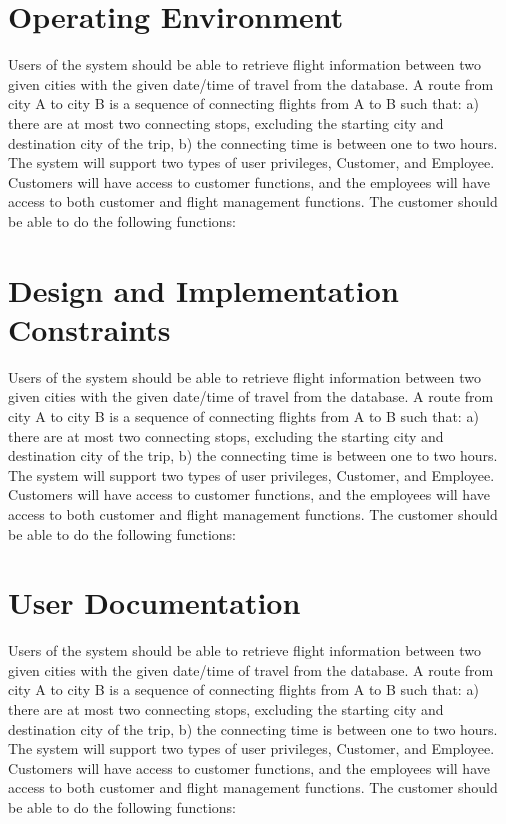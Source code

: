 \documentclass{scrreprt}
\begin{document}
    \section{Operating Environment}
    Users of the system should be able to retrieve flight information between two given cities with the given date/time of travel from the database. A route from city A to city B is a sequence of connecting flights from A to B such that: a) there are at most two connecting stops, excluding the starting city and destination city of the trip, b) the connecting time is between one to two hours. The system will support two types of user privileges, Customer, and Employee. Customers will have access to customer functions, and the employees will have access to both customer and flight management functions. The customer should be able to do the following functions:
    \section{Design and Implementation Constraints}
    Users of the system should be able to retrieve flight information between two given cities with the given date/time of travel from the database. A route from city A to city B is a sequence of connecting flights from A to B such that: a) there are at most two connecting stops, excluding the starting city and destination city of the trip, b) the connecting time is between one to two hours. The system will support two types of user privileges, Customer, and Employee. Customers will have access to customer functions, and the employees will have access to both customer and flight management functions. The customer should be able to do the following functions:
    \section{User Documentation}
    Users of the system should be able to retrieve flight information between two given cities with the given date/time of travel from the database. A route from city A to city B is a sequence of connecting flights from A to B such that: a) there are at most two connecting stops, excluding the starting city and destination city of the trip, b) the connecting time is between one to two hours. The system will support two types of user privileges, Customer, and Employee. Customers will have access to customer functions, and the employees will have access to both customer and flight management functions. The customer should be able to do the following functions:
\end{document}

